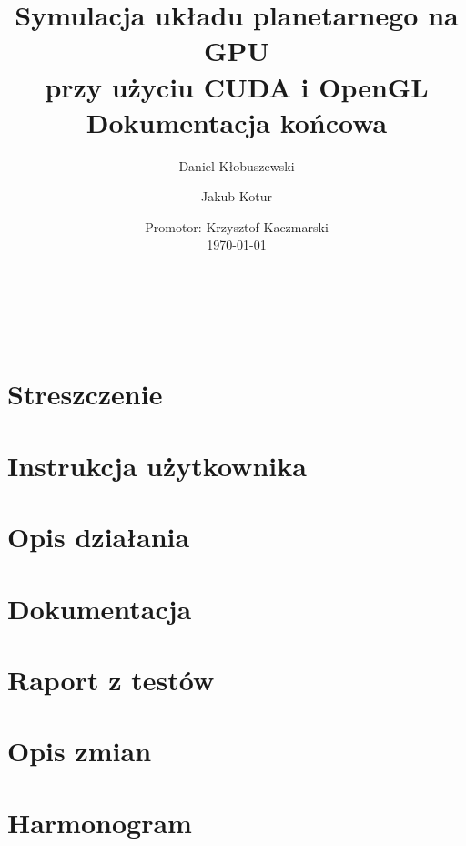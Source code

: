 \documentclass[a4paper,titlepage,10pt]{article}
\title{\huge Symulacja układu planetarnego na GPU\\ przy użyciu CUDA i OpenGL\\\small Dokumentacja końcowa}
\author{Daniel Kłobuszewski\and Jakub Kotur}
\date{Promotor: Krzysztof Kaczmarski\\\vspace{24pt}\today}
\begin{document}
	\maketitle
	
	\pagestyle{fancyplain}
	\cfoot{\thepage/\pageref{LastPage}}

	\hfill \\ 
	\hfill \\ 

	\newpage

	\tableofcontents

	\newpage

	\section{Streszczenie}\label{sec:streszczenie}
	
	\section{Instrukcja użytkownika}\label{sec:instrukcja użytkownika}
	
	\section{Opis działania}\label{sec:opis dzialania}
	
	\section{Dokumentacja}\label{sec:dokumentacja}
	
	\section{Raport z testów}\label{sec:raport z testów}
	
	\section{Opis zmian}\label{sec:opis zmian}
	
	\section{Harmonogram}\label{sec:harmonogram}
	
\end{document}
